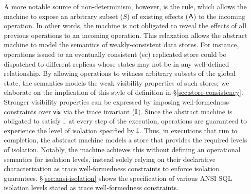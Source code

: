 A more notable source of non-determinism, however, is the
 rule, which allows the machine to expose an
arbitrary subset ($S$) of existing effects ($\textsf{A}$) to the incoming
operation. In other words, the machine is not obligated to reveal the
effects of all previous operations to an incoming operation. This
relaxation allows the abstract machine to model the semantics of
weakly-consistent data stores. For instance, operations issued to an
eventually consistent ({\sc ec}) replicated store could be dispatched
to different replicas whose states may not be in any well-defined
relationship. By allowing operations to witness arbitrary subsets of
the global state, the semantics models the weak visibility properties
of such stores; we elaborate on the implication of this style of
definition in \S\ref{sec:store-consistency}.  Stronger visibility
properties can be expressed by imposing well-formedness constraints
over $\textsf{vis}$ via the trace invariant ($\mathbb{I}$). Since the abstract
machine is obligated to satisfy $\mathbb{I}$ at every step of the execution,
operations are guaranteed to experience the level of isolation
specified by $\mathbb{I}$.  Thus, in executions that run to completion, the
abstract machine models a store that provides the required levels of
isolation.  Notably, the machine achieves this without defining an
operational semantics for isolation levels, instead solely relying on
their declarative characterization as trace well-formedness
constraints to enforce isolation guarantees.
\S\ref{sec:ansi-isolation} shows the specification of various ANSI SQL
isolation levels stated as trace well-formedness constraints.



